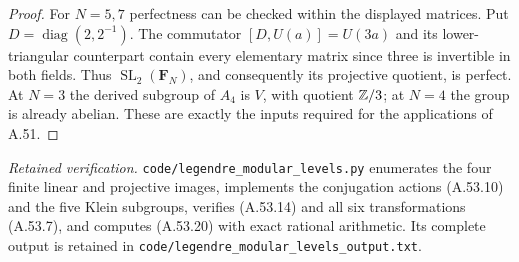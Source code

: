 \begin{proof}
For $N=5,7$ perfectness can be checked within the displayed
matrices.  Put $D=\operatorname{diag}(2,2^{-1})$.  The commutator
$[D,U(a)]=U(3a)$ and its lower-triangular counterpart contain
every elementary matrix since three is invertible in both
fields.  Thus $\operatorname{SL}_2(\mathbf F_N)$, and consequently
its projective quotient, is perfect.  At $N=3$ the derived
subgroup of $A_4$ is $V$, with quotient $\mathbb Z/3$; at $N=4$ the
group is already abelian.  These are exactly the inputs required
for the applications of A.51.
\end{proof}

\noindent\emph{Retained verification.}
\texttt{code/legendre\_modular\_levels.py} enumerates the
four finite linear and projective images, implements the conjugation
actions (A.53.10) and the five Klein subgroups, verifies (A.53.14)
and all six transformations (A.53.7), and computes (A.53.20) with
exact rational arithmetic.  Its complete output is retained in
\texttt{code/legendre\_modular\_levels\_output.txt}.
